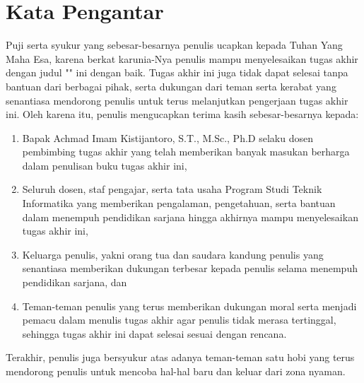 \chapter*{Kata Pengantar}

Puji serta syukur yang sebesar-besarnya penulis ucapkan kepada Tuhan Yang Maha Esa, karena berkat karunia-Nya penulis mampu menyelesaikan tugas akhir dengan judul "\thetitle" ini dengan baik. Tugas akhir ini juga tidak dapat selesai tanpa bantuan dari berbagai pihak, serta dukungan dari teman serta kerabat yang senantiasa mendorong penulis untuk terus melanjutkan pengerjaan tugas akhir ini. Oleh karena itu, penulis mengucapkan terima kasih sebesar-besarnya kepada:

\begin{enumerate}
  \item Bapak Achmad Imam Kistijantoro, S.T., M.Sc., Ph.D selaku dosen pembimbing tugas akhir yang telah memberikan banyak masukan berharga dalam penulisan buku tugas akhir ini,
  \item Seluruh dosen, staf pengajar, serta tata usaha Program Studi Teknik Informatika yang memberikan pengalaman, pengetahuan, serta bantuan dalam menempuh pendidikan sarjana hingga akhirnya mampu menyelesaikan tugas akhir ini,
  \item Keluarga penulis, yakni orang tua dan saudara kandung penulis yang senantiasa memberikan dukungan terbesar kepada penulis selama menempuh pendidikan sarjana, dan
  \item Teman-teman penulis yang terus memberikan dukungan moral serta menjadi pemacu dalam menulis tugas akhir agar penulis tidak merasa tertinggal, sehingga tugas akhir ini dapat selesai sesuai dengan rencana.
\end{enumerate}

Terakhir, penulis juga bersyukur atas adanya teman-teman satu hobi yang terus mendorong penulis untuk mencoba hal-hal baru dan keluar dari zona nyaman.

